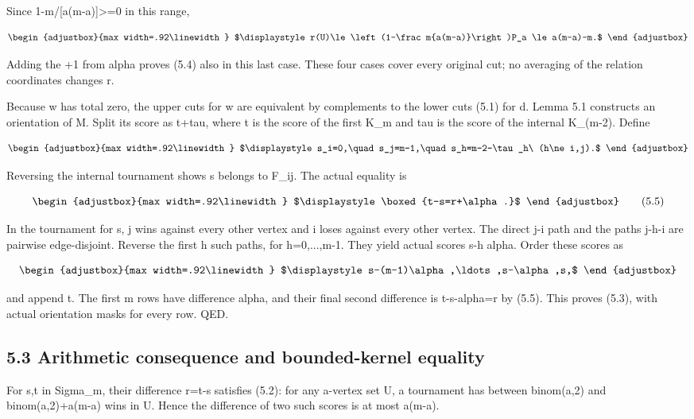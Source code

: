 Since 1-m/{[}a(m-a){]}\textgreater=0 in this range,

\[
\begin{adjustbox}{max width=.92\linewidth}
$\displaystyle r(U)\le\left(1-\frac m{a(m-a)}\right)P_a
\le a(m-a)-m.$
\end{adjustbox}
\]

Adding the +1 from alpha proves (5.4) also in this last case. These four cases cover every original cut; no averaging of the relation coordinates changes r.

Because w has total zero, the upper cuts for w are equivalent by complements to the lower cuts (5.1) for d. Lemma 5.1 constructs an orientation of M. Split its score as t+tau, where t is the score of the first K\_m and tau is the score of the internal K\_(m-2). Define

\[
\begin{adjustbox}{max width=.92\linewidth}
$\displaystyle s_i=0,\quad s_j=m-1,\quad s_h=m-2-\tau_h\ (h\ne i,j).$
\end{adjustbox}
\]

Reversing the internal tournament shows s belongs to F\_ij. The actual equality is

\[
\begin{adjustbox}{max width=.92\linewidth}
$\displaystyle \boxed{t-s=r+\alpha.}$
\end{adjustbox}
\tag{5.5}
\]

In the tournament for s, j wins against every other vertex and i loses against every other vertex. The direct j-i path and the paths j-h-i are pairwise edge-disjoint. Reverse the first h such paths, for h=0,...,m-1. They yield actual scores s-h alpha. Order these scores as

\[
\begin{adjustbox}{max width=.92\linewidth}
$\displaystyle s-(m-1)\alpha,\ldots,s-\alpha,s,$
\end{adjustbox}
\]

and append t. The first m rows have difference alpha, and their final second difference is t-s-alpha=r by (5.5). This proves (5.3), with actual orientation masks for every row. QED.

\subsection{5.3 Arithmetic consequence and bounded-kernel equality}\label{n08-arithmetic-consequence-and-bounded-kernel-equality}

For s,t in Sigma\_m, their difference r=t-s satisfies (5.2): for any a-vertex set U, a tournament has between binom(a,2) and binom(a,2)+a(m-a) wins in U. Hence the difference of two such scores is at most a(m-a).

